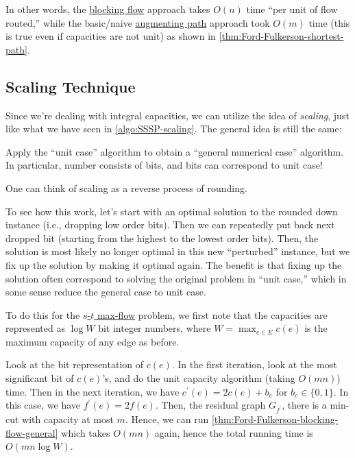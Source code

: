 In other words, the \hyperref[def:blocking-flow]{blocking flow} approach takes \(O(n)\) time ``per unit of flow routed,'' while the basic/naive \hyperref[def:augmenting-path]{augmenting path} approach took \(O(m)\) time (this is true even if capacities are not unit) as shown in \autoref{thm:Ford-Fulkerson-shortest-path}.

\subsection{Scaling Technique}
Since we're dealing with integral capacities, we can utilize the idea of \emph{scaling}, just like what we have seen in \autoref{algo:SSSP-scaling}. The general idea is still the same:

\begin{intuition}
	Apply the ``unit case'' algorithm to obtain a ``general numerical case'' algorithm. In particular, number consists of bits, and bits can correspond to unit case!
\end{intuition}

\begin{note}
	One can think of scaling as a reverse process of rounding.
\end{note}

To see how this work, let's start with an optimal solution to the rounded down instance (i.e., dropping low order bits). Then we can repeatedly put back next dropped bit (starting from the highest to the lowest order bits). Then, the solution is most likely no longer optimal in this new ``perturbed'' instance, but we fix up the solution by making it optimal again. The benefit is that fixing up the solution often correspond to solving the original problem in ``unit case,'' which in some sense reduce the general case to unit case.

To do this for the \hyperref[prb:s-t-max-flow]{\(s\)-\(t\) max-flow} problem, we first note that the capacities are represented as \(\log W\) bit integer numbers, where \(W = \max _{e \in E} c(e)\) is the maximum capacity of any edge as before.

Look at the bit representation of \(c(e)\). In the first iteration, look at the most significant bit of \(c(e)\)'s, and do the unit capacity algorithm (taking \(O(mn)\)) time. Then in the next iteration, we have \(c^{\prime} (e) = 2 c(e) + b_e\) for \(b_e \in \{ 0, 1 \} \). In this case, we have \(f^{\prime} (e) = 2 f(e)\). Then, the residual graph \(G_{f^{\prime} }\), there is a min-cut with capacity at most \(m\). Hence, we can run \autoref{thm:Ford-Fulkerson-blocking-flow-general} which takes \(O(mn)\) again, hence the total running time is \(O(mn \log W)\).


